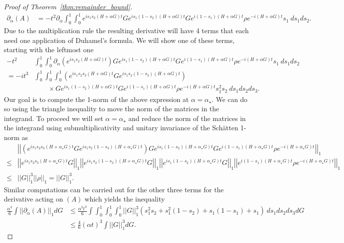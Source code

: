 \documentclass[
 amsmath,amssymb,
 aps,
onecolumn, 
nofootinbib]{revtex4-2}
\newcommand{\norm}[1]{\left|\left| #1 \right|\right|}
\begin{document}
\begin{proof}[Proof of Theorem~\ref{thm:remainder_bound}]
\begin{align}
\partial_{\alpha} (A) &= -t^2 \partial_{\alpha} \int_0^1 \int_0^1 e^{i s_1 s_2 (H+\alpha G)t} G e^{i s_1 (1-s_2) (H+\alpha G)t} G e^{i(1-s_1) (H+\alpha G)t} \rho e^{-i(H+\alpha G) t}   s_1 ~ds_1 ds_2.
\end{align}
Due to the multiplication rule the resulting derivative will have 4 terms that each need one application of Duhamel's formula. We will show one of these terms, starting with the leftmost one
\begin{align}
    -t^2  &\int_0^1 \int_0^1 \partial_{\alpha} \left( e^{i s_1 s_2 (H+\alpha G)t} \right) G e^{i s_1 (1-s_2) (H+\alpha G)t} G e^{i(1-s_1) (H+\alpha G)t} \rho e^{-i(H+\alpha G) t}   s_1 ~ds_1 ds_2 \\
    = - i t^3  &\int_0^1 \int_0^1 \int_0^1 \left( e^{i s_1 s_2 s_3 (H+\alpha G)t} G e^{i s_1 s_2 (1 - s_3) (H+\alpha G)t} \right)\nonumber\\
    &\qquad\times G e^{i s_1 (1-s_2) (H+\alpha G)t} G e^{i(1-s_1) (H+\alpha G)t} \rho e^{-i(H+\alpha G) t}   s_1^2 s_2 ~ds_1 ds_2 ds_3.
\end{align}
Our goal is to compute the 1-norm of the above expression at $\alpha = \alpha_{\star}$. We can do so using the triangle inequality to move the norm of the matrices in the integrand. To proceed we will set $\alpha = \alpha_{\star}$ and reduce the norm of the matrices in the integrand using submultiplicativity and unitary invariance of the Sch\"{a}tten 1-norm as 
\begin{align}
    &\norm{\left( e^{i s_1 s_2 s_3 (H+\alpha_{\star} G)t} G e^{i s_1 s_2 (1 - s_3) (H+\alpha_{\star} G)t} \right) G e^{i s_1 (1-s_2) (H+\alpha_{\star} G)t} G e^{i(1-s_1) (H+\alpha_{\star} G)t} \rho e^{-i(H+\alpha_{\star} G) t}}_1 \\
    \le &\norm{e^{i s_1 s_2 s_3 (H+\alpha_{\star} G)t} G}_1 \norm{e^{i s_1 s_2 (1 - s_3) (H+\alpha_{\star} G)t} G}_1 \norm{e^{i s_1 (1-s_2) (H+\alpha_{\star} G)t} G}_1 \norm{e^{i(1-s_1) (H+\alpha_{\star} G)t} \rho e^{-i(H+\alpha_{\star} G) t}}_1 \\
    \le &\norm{G}_1^3 \norm{\rho}_1 = \norm{G}_1^3 .
\end{align}
Similar computations can be carried out for the other three terms for the derivative acting on $(A)$ which yields the inequality
\begin{align}
    \frac{\alpha^3}{6} \int \norm{\partial_{\alpha} (A)}_1 dG &\le \frac{\alpha^3 t^3}{6} \int \int_0^1 \int_0^1 \int_0^1 \norm{G}_1^3 (s_1^2 s_2 + s_1^2 (1 - s_2) + s_1(1-s_1) + s_1) ~ds_1 ds_2 ds_3 dG \\
    &\le \frac{4}{6} (\alpha t)^3 \int \norm{G}_1^3 dG . \label{eq:remainder_bound_on_A}
\end{align}


\end{proof}
\end{document}
